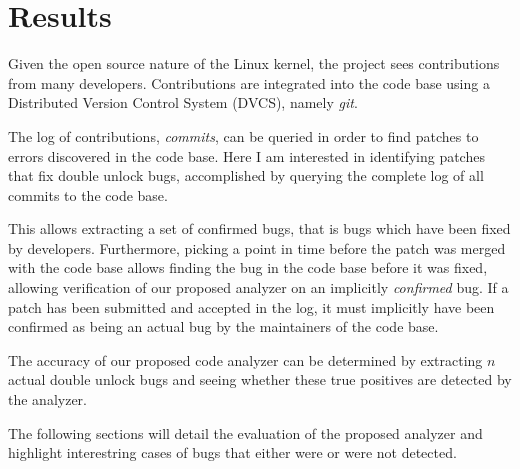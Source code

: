 \section{Results}

\newpar Given the open source nature of the Linux kernel, the project sees contributions from many developers. Contributions are integrated into the code base using a Distributed Version Control System (DVCS), namely \textit{git}. 

\newpar The log of contributions, \textit{commits}, can be queried in order to find patches to errors discovered in the code base. Here I am interested in identifying patches that fix double unlock bugs, accomplished by querying the complete log of all commits to the code base. 

\newpar This allows extracting a set of confirmed bugs, that is bugs which have been fixed by developers. Furthermore, picking a point in time before the patch was merged with the code base allows finding the bug in the code base before it was fixed, allowing verification of our proposed analyzer on an implicitly \textit{confirmed} bug. If a patch has been submitted and accepted in the log, it must implicitly have been confirmed as being an actual bug by the maintainers of the code base. 

\newpar The accuracy of our proposed code analyzer can be determined by extracting $n$ actual double unlock bugs and seeing whether these true positives are detected by the analyzer. 

\newpar The following sections will detail the evaluation of the proposed analyzer and highlight interestring cases of bugs that either were or were not detected. 